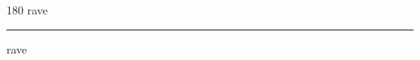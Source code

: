 
\begin{frame}
\begin{center}
\begin{turn}{180}
{\fontsize{2.5cm}{1em}\selectfont rave}
\end{turn}
\vspace{1em}\par  
\hrule
\vspace{1em}\par  
{\fontsize{2.5cm}{1em}\selectfont rave}
\end{center}
\end{frame}
